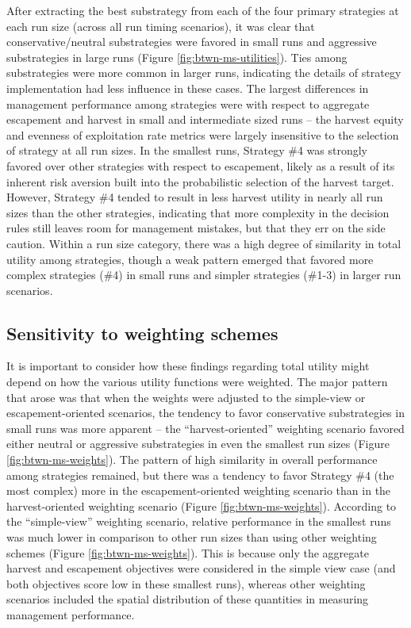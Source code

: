 \documentclass[12pt,]{book}
\theoremstyle{definition}
\theoremstyle{definition}
\theoremstyle{definition}
\theoremstyle{remark}
\begin{document}
\noindent
After extracting the best substrategy from each of the four primary
strategies at each run size (across all run timing scenarios), it was
clear that conservative/neutral substrategies were favored in small runs
and aggressive substrategies in large runs (Figure
\ref{fig:btwn-ms-utilities}). Ties among substrategies were more common
in larger runs, indicating the details of strategy implementation had
less influence in these cases. The largest differences in management
performance among strategies were with respect to aggregate escapement
and harvest in small and intermediate sized runs -- the harvest equity
and evenness of exploitation rate metrics were largely insensitive to
the selection of strategy at all run sizes. In the smallest runs,
Strategy \#4 was strongly favored over other strategies with respect to
escapement, likely as a result of its inherent risk aversion built into
the probabilistic selection of the harvest target. However, Strategy \#4
tended to result in less harvest utility in nearly all run sizes than
the other strategies, indicating that more complexity in the decision
rules still leaves room for management mistakes, but that they err on
the side caution. Within a run size category, there was a high degree of
similarity in total utility among strategies, though a weak pattern
emerged that favored more complex strategies (\#4) in small runs and
simpler strategies (\#1-3) in larger run scenarios.

\subsection{Sensitivity to weighting
schemes}\label{sensitivity-to-weighting-schemes}

\noindent
It is important to consider how these findings regarding total utility
might depend on how the various utility functions were weighted. The
major pattern that arose was that when the weights were adjusted to the
simple-view or escapement-oriented scenarios, the tendency to favor
conservative substrategies in small runs was more apparent -- the
``harvest-oriented'' weighting scenario favored either neutral or
aggressive substrategies in even the smallest run sizes (Figure
\ref{fig:btwn-ms-weights}). The pattern of high similarity in overall
performance among strategies remained, but there was a tendency to favor
Strategy \#4 (the most complex) more in the escapement-oriented
weighting scenario than in the harvest-oriented weighting scenario
(Figure \ref{fig:btwn-ms-weights}). According to the ``simple-view''
weighting scenario, relative performance in the smallest runs was much
lower in comparison to other run sizes than using other weighting
schemes (Figure \ref{fig:btwn-ms-weights}). This is because only the
aggregate harvest and escapement objectives were considered in the
simple view case (and both objectives score low in these smallest runs),
whereas other weighting scenarios included the spatial distribution of
these quantities in measuring management performance.
\end{document}
